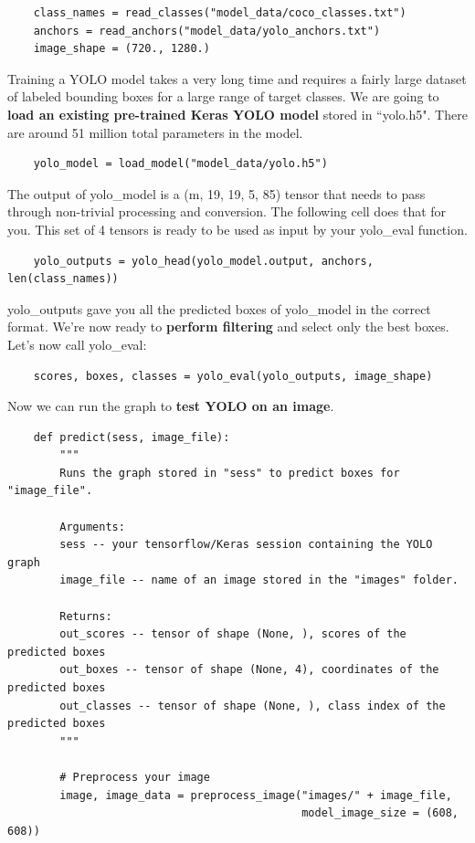 \documentclass[11pt, a4paper]{article}
\begin{document}
\begin{spacing}{1.1}
	\begin{lstlisting}
	class_names = read_classes("model_data/coco_classes.txt")
	anchors = read_anchors("model_data/yolo_anchors.txt")
	image_shape = (720., 1280.) \end{lstlisting} \vspace*{1mm}
	Training a YOLO model takes a very long time and requires a fairly large dataset of labeled bounding boxes for a large range of target classes. We are going to \textbf{load an existing pre-trained Keras YOLO model} stored in ``yolo.h5". There are around 51 million total parameters in the model.
	\begin{lstlisting}
	yolo_model = load_model("model_data/yolo.h5") \end{lstlisting} \vspace*{1mm}
	The output of yolo\_model is a (m, 19, 19, 5, 85) tensor that needs to pass through non-trivial processing and conversion. The following cell does that for you. This set of 4 tensors is ready to be used as input by your yolo\_eval function.
	\begin{lstlisting}
	yolo_outputs = yolo_head(yolo_model.output, anchors, len(class_names))	\end{lstlisting} \vspace*{1mm}
	yolo\_outputs gave you all the predicted boxes of yolo\_model in the correct format. We're now ready to \textbf{perform filtering} and select only the best boxes. Let's now call yolo\_eval: 
	\begin{lstlisting}
	scores, boxes, classes = yolo_eval(yolo_outputs, image_shape)	\end{lstlisting} \vspace*{1mm}
	Now we can run the graph to \textbf{test YOLO on an image}. 
	\begin{lstlisting}
	def predict(sess, image_file):
		"""
		Runs the graph stored in "sess" to predict boxes for "image_file".
		
		Arguments:
		sess -- your tensorflow/Keras session containing the YOLO graph
		image_file -- name of an image stored in the "images" folder.
		
		Returns:
		out_scores -- tensor of shape (None, ), scores of the predicted boxes
		out_boxes -- tensor of shape (None, 4), coordinates of the predicted boxes
		out_classes -- tensor of shape (None, ), class index of the predicted boxes
		"""
		
		# Preprocess your image
		image, image_data = preprocess_image("images/" + image_file, 
		                                     model_image_size = (608, 608)) \end{lstlisting} \newpage
		                                     

\end{spacing}
\end{document}
